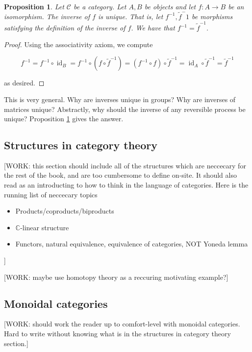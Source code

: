 \documentclass{article}
\newtheorem{proposition}{Proposition}[section]
\theoremstyle{definition}
\DeclareMathOperator{\id}{id}
\newcommand{\CC}{\mathbb{C}}
\newcommand{\C}{\mathscr{C}}
\newcommand{\0}{\left|0\right>}
\newcommand{\1}{\left|1\right>}
\numberwithin{figure}{section}
\begin{document}
\begin{proposition}
\label{inverse-unique}
Let $\C$ be a category. Let $A,B$ be objects and let $f:A\to B$ be an isomorphism. The inverse of $f$ is unique. That is, let $f^{-1},\tilde{f}^-1$ be morphisms satisfying the definition of the inverse of $f$. We have that $f^{-1}=\tilde{f}^{-1}$.
\end{proposition}
\begin{proof} Using the associativity axiom, we compute

$$f^{-1}=f^{-1}\circ \id _{B} = f^{-1}\circ (f \circ \tilde{f}^{-1})=(f^{-1}\circ f)\circ \tilde{f}^{-1}=\id_A \circ \tilde{f}^{-1}=\tilde{f}^{-1}$$

as desired.
\end{proof}

This is very general. Why are inverses unique in groups? Why are inverses of matrices unique? Abstractly, why should the inverse of any reversible process be unique? Proposition \ref{inverse-unique} gives the answer.

\subsection{Structures in category theory}

[WORK: this section should include all of the structures which are neccecary for the rest of the book,
and are too cumbersome to define on-site. It should also read as an introducting to how to think in the language of categories. Here is the running list of neccecary topics

\begin{itemize}
\item Products/coproducts/biproducts
\item $\CC$-linear structure
\item Functors, natural equivalence, equivalence of categories, NOT Yoneda lemma
\end{itemize}
]

[WORK: maybe use homotopy theory as a reccuring motivating example?]

\subsection{Monoidal categories}

[WORK: should work the reader up to comfort-level with monoidal categories. Hard to write without knowing what is in the structures in category theory section.]
\end{document}
